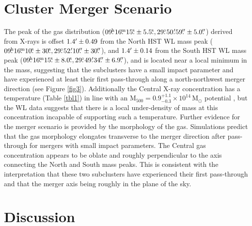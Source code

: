 \section{Cluster Merger Scenario}

The peak of the gas distribution ($09\fh16\fm15\fs\pm5.5\fs, 29\fdg50\farcm59\farcs\pm5.0\farcs$) derived from X-rays is offset $1.4\mbox{$^\prime$}\pm0.49$ from the North HST WL mass peak ($09\fh16\fm10\fs\pm30\fs, 29\fdg52\farcm10\farcs\pm30\farcs$), and $1.4\mbox{$^\prime$}\pm0.14$ from the South HST WL mass peak ($09\fh16\fm15\fs\pm8.0\fs, 29\fdg49\farcm34\farcs\pm6.9\farcs$), and is located near a local minimum in the mass, suggesting that the subclusters have a small impact parameter and have experienced at least their first pass-through along a north-northwest merger direction (see Figure \ref{fig3}).
Additionally the Central X-ray concentration has a temperature (Table \ref{tbl1}) in line with an M$_{500}=0.9^{+1.1}_{-0.3}\times10^{14}$\,M$_{\odot}$ potential \citep{Vikhlinin:2009jy}, but the WL data suggests that there is a local under-density of mass at this concentration incapable of supporting such a temperature.
Further evidence for the merger scenario is provided by the morphology of the gas.
Simulations \citep{Schindler:1993vl,Poole:2006gp} predict that the gas morphology elongates transverse to the merger direction after pass-through for mergers with small impact parameters.
The Central gas concentration appears to be oblate and roughly perpendicular to the axis connecting the North and South mass peaks.
This is consistent with the interpretation that these two subclusters have experienced their first pass-through and that the merger axis being roughly in the plane of the sky.

\section{Discussion}

